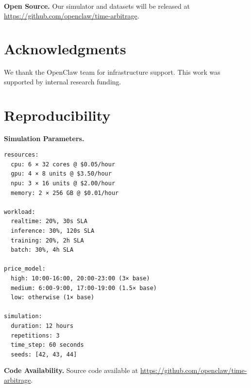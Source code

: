 \documentclass[10pt,conference]{IEEEtran}
\begin{document}
\textbf{Open Source.} Our simulator and datasets will be released at \url{https://github.com/openclaw/time-arbitrage}.

\section*{Acknowledgments}

We thank the OpenClaw team for infrastructure support. This work was supported by internal research funding.




\appendix
\section{Reproducibility}

\textbf{Simulation Parameters.}
\begin{verbatim}
resources:
  cpu: 6 × 32 cores @ $0.05/hour
  gpu: 4 × 8 units @ $3.50/hour
  npu: 3 × 16 units @ $2.00/hour
  memory: 2 × 256 GB @ $0.01/hour

workload:
  realtime: 20%, 30s SLA
  inference: 30%, 120s SLA
  training: 20%, 2h SLA
  batch: 30%, 4h SLA

price_model:
  high: 10:00-16:00, 20:00-23:00 (3× base)
  medium: 6:00-9:00, 17:00-19:00 (1.5× base)
  low: otherwise (1× base)

simulation:
  duration: 12 hours
  repetitions: 3
  time_step: 60 seconds
  seeds: [42, 43, 44]
\end{verbatim}

\textbf{Code Availability.} Source code available at \url{https://github.com/openclaw/time-arbitrage}.
\end{document}

